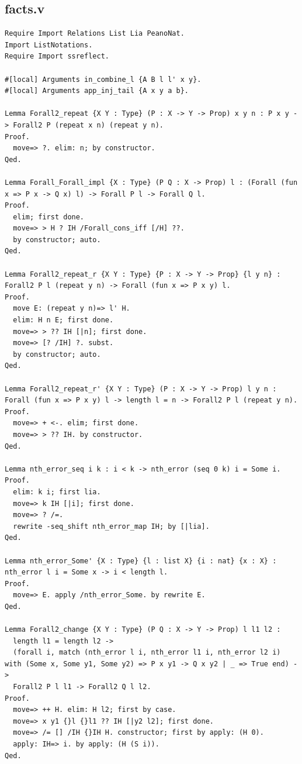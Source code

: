 \documentclass[10pt,a4paper]{amsart}
\begin{document}
\subsection*{facts.v}
\begin{lstlisting}
Require Import Relations List Lia PeanoNat.
Import ListNotations.
Require Import ssreflect.

#[local] Arguments in_combine_l {A B l l' x y}.
#[local] Arguments app_inj_tail {A x y a b}.

Lemma Forall2_repeat {X Y : Type} (P : X -> Y -> Prop) x y n : P x y -> Forall2 P (repeat x n) (repeat y n).
Proof.
  move=> ?. elim: n; by constructor.
Qed.

Lemma Forall_Forall_impl {X : Type} (P Q : X -> Prop) l : (Forall (fun x => P x -> Q x) l) -> Forall P l -> Forall Q l.
Proof.
  elim; first done.
  move=> > H ? IH /Forall_cons_iff [/H] ??.
  by constructor; auto.
Qed.

Lemma Forall2_repeat_r {X Y : Type} {P : X -> Y -> Prop} {l y n} : Forall2 P l (repeat y n) -> Forall (fun x => P x y) l.
Proof.
  move E: (repeat y n)=> l' H.
  elim: H n E; first done.
  move=> > ?? IH [|n]; first done.
  move=> [? /IH] ?. subst.
  by constructor; auto.
Qed.

Lemma Forall2_repeat_r' {X Y : Type} (P : X -> Y -> Prop) l y n : Forall (fun x => P x y) l -> length l = n -> Forall2 P l (repeat y n).
Proof.
  move=> + <-. elim; first done.
  move=> > ?? IH. by constructor.
Qed.

Lemma nth_error_seq i k : i < k -> nth_error (seq 0 k) i = Some i.
Proof.
  elim: k i; first lia.
  move=> k IH [|i]; first done.
  move=> ? /=.
  rewrite -seq_shift nth_error_map IH; by [|lia].
Qed.

Lemma nth_error_Some' {X : Type} {l : list X} {i : nat} {x : X} : nth_error l i = Some x -> i < length l.
Proof.
  move=> E. apply /nth_error_Some. by rewrite E.
Qed.

Lemma Forall2_change {X Y : Type} (P Q : X -> Y -> Prop) l l1 l2 :
  length l1 = length l2 ->
  (forall i, match (nth_error l i, nth_error l1 i, nth_error l2 i) with (Some x, Some y1, Some y2) => P x y1 -> Q x y2 | _ => True end) ->
  Forall2 P l l1 -> Forall2 Q l l2.
Proof.
  move=> ++ H. elim: H l2; first by case.
  move=> x y1 {}l {}l1 ?? IH [|y2 l2]; first done.
  move=> /= [] /IH {}IH H. constructor; first by apply: (H 0).
  apply: IH=> i. by apply: (H (S i)).
Qed.


\end{lstlisting}
\end{document}
